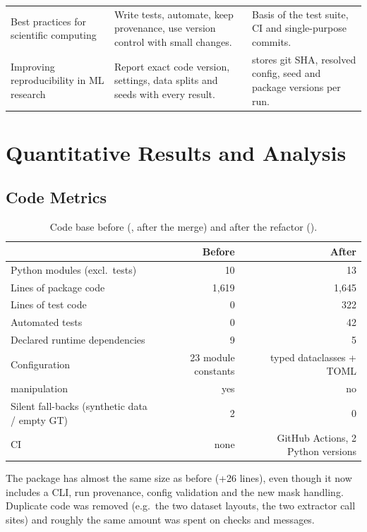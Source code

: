 \documentclass[11pt,a4paper]{article}
\newcommand{\code}[1]{\texttt{\detokenize{#1}}}
\begin{document}
\begin{center}
\begin{longtable}{@{}p{}p{}p{}@{}}
Best practices for scientific computing \cite{wilson2014} & Write tests, automate, keep provenance, use version control with small changes. & Basis of the test suite, CI and single-purpose commits. \\
Improving reproducibility in ML research \cite{pineau2021} & Report exact code version, settings, data splits and seeds with every result. & \code{run_config.json} stores git SHA, resolved config, seed and package versions per run. \\
\bottomrule
\end{longtable}
\end{center}

\section*{Quantitative Results and Analysis}

\subsection*{Code Metrics}

\begin{table}[h]
\centering
\caption{Code base before (\code{fd47eab}, after the \code{week-5} merge) and after the refactor (\code{e591877}).}
\label{tab:codemetrics}
\small
\begin{tabular}{@{}lrr@{}}
\toprule
& \textbf{Before} & \textbf{After} \\
\midrule
Python modules (excl.\ tests) & 10 & 13 \\
Lines of package code & 1{,}619 & 1{,}645 \\
Lines of test code & 0 & 322 \\
Automated tests & 0 & 42 \\
Declared runtime dependencies & 9 & 5 \\
Configuration & 23 module constants & typed dataclasses + TOML \\
\code{sys.path} manipulation & yes & no \\
Silent fall-backs (synthetic data / empty GT) & 2 & 0 \\
CI & none & GitHub Actions, 2 Python versions \\
\bottomrule
\end{tabular}
\end{table}

The package has almost the same size as before (+26 lines), even though it now includes a CLI, run provenance, config validation and the new mask handling. Duplicate code was removed (e.g.\ the two dataset layouts, the two extractor call sites) and roughly the same amount was spent on checks and messages.
\end{document}
